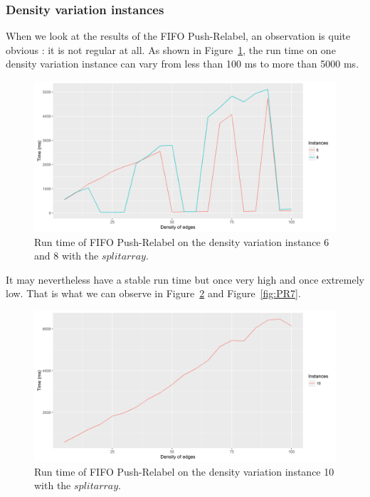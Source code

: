 \subsubsection{Density variation instances}
When we look at the results of the FIFO Push-Relabel, an observation is quite obvious : it is not regular at all. As shown in Figure~\ref{fig:PR6}, the run time on one density variation instance can vary from less than 100 ms to more than 5000 ms.
\begin{figure}[H]
\begin{center}
\includegraphics[scale=0.5]{images/results/pri68.png}
\caption{Run time of FIFO Push-Relabel on the density variation instance 6 and 8 with the $split array$.}
\label{fig:PR6}
\end{center}
\end{figure}
It may nevertheless have a stable run time but once very high and once extremely low. That is what we can observe in Figure~\ref{fig:PR10} and Figure~\ref{fig:PR7}.
\begin{figure}[H]
\begin{center}
\includegraphics[scale=0.5]{images/results/pri10.png}
\caption{Run time of FIFO Push-Relabel on the density variation instance 10 with the $split array$.}
\label{fig:PR10}
\end{center}
\end{figure}
